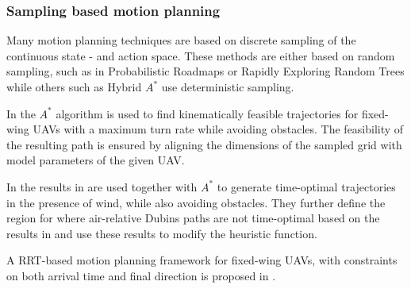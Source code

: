 \subsubsection{Sampling based motion planning}
Many motion planning techniques are based on discrete sampling of the continuous state - and action space. These methods are either based on 
random sampling, such as in Probabilistic Roadmaps \cite{prm} or Rapidly Exploring Random Trees \cite{rrt} while others such as Hybrid $A^*$ \cite{hybrid_astar} use 
deterministic sampling.

In \cite{2_phase_uav} the $A^*$ algorithm \cite{astar} is used to find kinematically feasible trajectories for fixed-wing UAVs with 
a maximum turn rate while avoiding obstacles. The feasibility of the resulting path is ensured by aligning the dimensions of the 
sampled grid with model parameters of the given UAV.

In \cite{wind_astar} the results in \cite{optimal_path_trochoidal} are used together with $A^*$ to generate time-optimal trajectories in the 
presence of wind, while also avoiding obstacles. They further define the region for where air-relative Dubins paths are not time-optimal 
based on the results in \cite{optimal_path_target} and use these results to modify the heuristic function.

A RRT-based motion planning framework for fixed-wing UAVs, with constraints on both arrival time and final direction is proposed in \cite{rrt_uav}.

